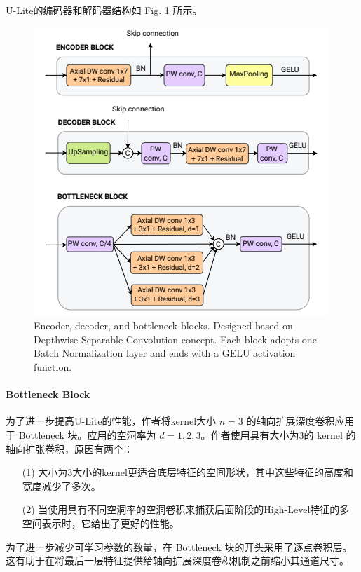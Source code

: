 \documentclass[a4paper, 10pt]{article}
\begin{document}
			U-Lite的编码器和解码器结构如 Fig. \ref{fig: Encoder and Decoder} 所示。
			
			\begin{figure}[htbp]
				\centering 
				\includegraphics[width=0.6\columnwidth]{picture/Lightweight Model/Encoder and Decoder}
				\caption{
					\label{fig: Encoder and Decoder} 
					Encoder, decoder, and bottleneck blocks. Designed based on Depthwise Separable Convolution concept. Each block adopts one Batch Normalization layer and ends with a GELU activation function.
				}
			\end{figure}
			
			\paragraph{Bottleneck Block}
			
			为了进一步提高U-Lite的性能，作者将kernel大小 $n=3$ 的轴向扩展深度卷积应用于 Bottleneck 块。应用的空洞率为 $d = 1,2,3$。作者使用具有大小为3的 kernel 的轴向扩张卷积，原因有两个：
			
			\begin{itemize}
				\item [(1)] 大小为3大小的kernel更适合底层特征的空间形状，其中这些特征的高度和宽度减少了多次。
				
				\item [(2)] 当使用具有不同空洞率的空洞卷积来捕获后面阶段的High-Level特征的多空间表示时，它给出了更好的性能。
			\end{itemize}
			
			为了进一步减少可学习参数的数量，在 Bottleneck 块的开头采用了逐点卷积层。这有助于在将最后一层特征提供给轴向扩展深度卷积机制之前缩小其通道尺寸。
			
\end{document}
